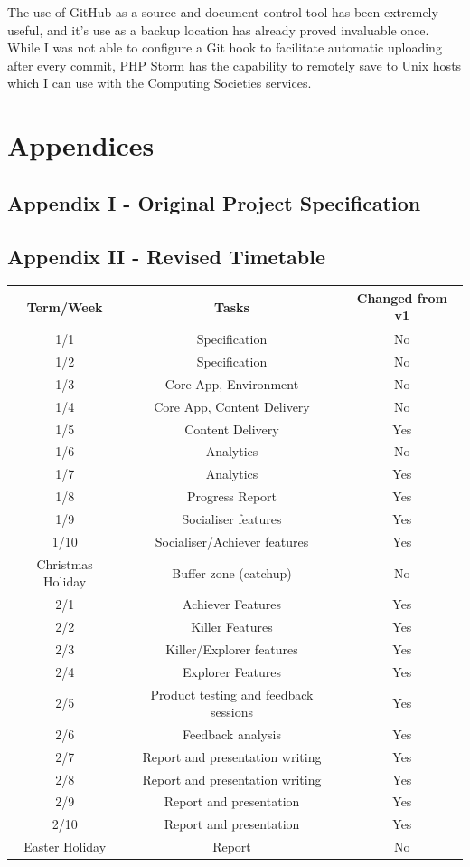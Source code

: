 \documentclass[10pt,a4paper]{report}
\begin{document}
The use of GitHub as a source and document control tool has been extremely useful, and it's use as a backup location has already proved invaluable once. While I was not able to configure a Git hook to facilitate automatic uploading after every commit, PHP Storm has the capability to remotely save to Unix hosts which I can use with the Computing Societies services.

\section*{Appendices}

\subsection*{Appendix I - Original Project Specification}


\subsection*{Appendix II - Revised Timetable}
\begin{tabular}{|c|c|c|}
	\hline Term/Week & Tasks & Changed from v1 \\ 
	\hline 1/1 & Specification & No \\ 
	\hline 1/2 & Specification & No \\ 
	\hline 1/3 & Core App, Environment & No \\ 
	\hline 1/4 & Core App, Content Delivery & No \\
	\hline 1/5 & Content Delivery & Yes \\
	\hline 1/6 & Analytics & No \\ 
	\hline 1/7 & Analytics & Yes \\
	\hline 1/8 & Progress Report & Yes \\
	\hline 1/9 & Socialiser features & Yes \\
	\hline 1/10 & Socialiser/Achiever features & Yes \\
	\hline Christmas Holiday & Buffer zone (catchup) & No \\
	\hline 2/1 & Achiever Features & Yes \\ 
	\hline 2/2 & Killer Features & Yes \\ 
	\hline 2/3 & Killer/Explorer features & Yes \\ 
	\hline 2/4 & Explorer Features & Yes \\ 
	\hline 2/5 & Product testing and feedback sessions & Yes \\ 
	\hline 2/6 & Feedback analysis & Yes \\ 
	\hline 2/7 & Report and presentation writing & Yes \\ 
	\hline 2/8 & Report and presentation writing & Yes \\ 
	\hline 2/9 & Report and presentation & Yes \\ 
	\hline 2/10 & Report and presentation & Yes \\
	\hline Easter Holiday & Report & No \\
	\hline 
\end{tabular}
\end{document}
